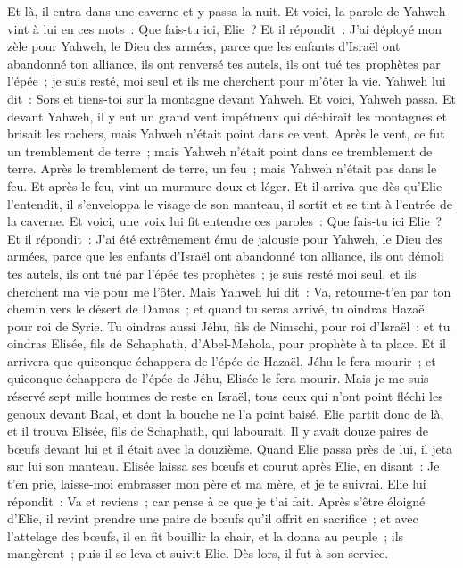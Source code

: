 \begin{multicols}{2}
Et là, il entra dans une caverne et y passa la nuit. Et voici, la parole de Yahweh vint à lui en ces mots~: Que fais-tu ici, Elie~?
Et il répondit~: J'ai déployé mon zèle pour Yahweh, le Dieu des armées, parce que les enfants d'Israël ont abandonné ton alliance, ils ont renversé tes autels, ils ont tué tes prophètes par l'épée~; je suis resté, moi seul et ils me cherchent pour m'ôter la vie.
Yahweh lui dit~: Sors et tiens-toi sur la montagne devant Yahweh. Et voici, Yahweh passa. Et devant Yahweh, il y eut un grand vent impétueux qui déchirait les montagnes et brisait les rochers, mais Yahweh n'était point dans ce vent. Après le vent, ce fut un tremblement de terre~; mais Yahweh n'était point dans ce tremblement de terre.
Après le tremblement de terre, un feu~; mais Yahweh n'était pas dans le feu. Et après le feu, vint un murmure doux et léger.
Et il arriva que dès qu'Elie l'entendit, il s'enveloppa le visage de son manteau, il sortit et se tint à l'entrée de la caverne. Et voici, une voix lui fit entendre ces paroles~: Que fais-tu ici Elie~?
Et il répondit~: J'ai été extrêmement ému de jalousie pour Yahweh, le Dieu des armées, parce que les enfants d'Israël ont abandonné ton alliance, ils ont démoli tes autels, ils ont tué par l'épée tes prophètes~; je suis resté moi seul, et ils cherchent ma vie pour me l'ôter.
Mais Yahweh lui dit~: Va, retourne-t'en par ton chemin vers le désert de Damas~; et quand tu seras arrivé, tu oindras Hazaël pour roi de Syrie.
Tu oindras aussi Jéhu, fils de Nimschi, pour roi d'Israël~; et tu oindras Elisée, fils de Schaphath, d'Abel-Mehola, pour prophète à ta place.
Et il arrivera que quiconque échappera de l'épée de Hazaël, Jéhu le fera mourir~; et quiconque échappera de l'épée de Jéhu, Elisée le fera mourir.
Mais je me suis réservé sept mille hommes de reste en Israël, tous ceux qui n'ont point fléchi les genoux devant Baal, et dont la bouche ne l'a point baisé.
Elie partit donc de là, et il trouva Elisée, fils de Schaphath, qui labourait. Il y avait douze paires de bœufs devant lui et il était avec la douzième. Quand Elie passa près de lui, il jeta sur lui son manteau.
Elisée laissa ses bœufs et courut après Elie, en disant~: Je t'en prie, laisse-moi embrasser mon père et ma mère, et je te suivrai. Elie lui répondit~: Va et reviens~; car pense à ce que je t'ai fait.
Après s'être éloigné d'Elie, il revint prendre une paire de bœufs qu'il offrit en sacrifice~; et avec l'attelage des bœufs, il en fit bouillir la chair, et la donna au peuple~; ils mangèrent~; puis il se leva et suivit Elie. Dès lors, il fut à son service.

\end{multicols}
